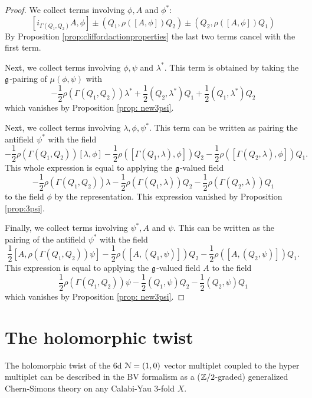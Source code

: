 \documentclass[10pt, oneside]{article}
\begin{document}
\begin{proof}
We collect terms involving $\phi, A$ and $\phi^*$:
\[
[i_{\Gamma(Q_1, Q_2)} A, \phi] \pm (Q_1, \rho([A,\phi])Q_2) \pm (Q_2, \rho([A,\phi])Q_1)
\]
By Proposition \ref{prop:cliffordactionproperties} the last two terms cancel with the first term. 

Next, we collect terms involving $\phi, \psi$ and $\lambda^*$. 
This term is obtained by taking the $\mathfrak g$-pairing of $\mu(\phi, \psi)$ with
\[
-\frac{1}{2} \rho(\Gamma(Q_1,Q_2)) \lambda^* + \frac{1}{2} (Q_2, \lambda^*)Q_1 + \frac{1}{2} (Q_1, \lambda^*) Q_2
\]
which vanishes by Proposition \ref{prop: new3psi}.

Next, we collect terms involving $\lambda, \phi, \psi^*$.
This term can be written as pairing the antifield $\psi^*$ with the field
\[
- \frac{1}{2} \rho(\Gamma(Q_1,Q_2)) [\lambda, \phi] - \frac{1}{2} \rho([\Gamma(Q_1,\lambda), \phi]) Q_2  - \frac{1}{2} \rho([\Gamma(Q_2,\lambda), \phi]) Q_1. 
\]
This whole expression is equal to applying the $\mathfrak g$-valued field 
\[
- \frac{1}{2} \rho(\Gamma(Q_1,Q_2)) \lambda - \frac{1}{2} \rho(\Gamma(Q_1,\lambda)) Q_2  - \frac{1}{2} \rho(\Gamma(Q_2,\lambda)) Q_1
\]
to the field $\phi$ by the representation. 
This expression vanished by Proposition \ref{prop:3psi}.

Finally, we collect terms involving $\psi^*,A$ and $\psi$.
This can be written as the pairing of the antifield $\psi^*$ with the field
\[
\frac{1}{2} [A, \rho(\Gamma(Q_1,Q_2)) \psi] -\frac{1}{2} \rho([A, (Q_1, \psi)]) Q_2 - \frac{1}{2} \rho([A, (Q_2, \psi)]) Q_1 .
\] 
This expression is equal to applying the $\mathfrak g$-valued field $A$ to the field
\[
\frac{1}{2} \rho(\Gamma(Q_1,Q_2)) \psi -\frac{1}{2} (Q_1, \psi) Q_2 -\frac{1}{2} (Q_2, \psi) Q_1
\]
which vanishes by Proposition \ref{prop: new3psi}.


\end{proof}



\section{The holomorphic twist}

The holomorphic twist of the 6d $\mathcal N=(1,0)$ vector multiplet coupled to the hyper multiplet can be described in the BV formalism as a ($\mathbb Z/2$-graded) generalized Chern-Simons theory on any Calabi-Yau $3$-fold $X$. 
\end{document}

